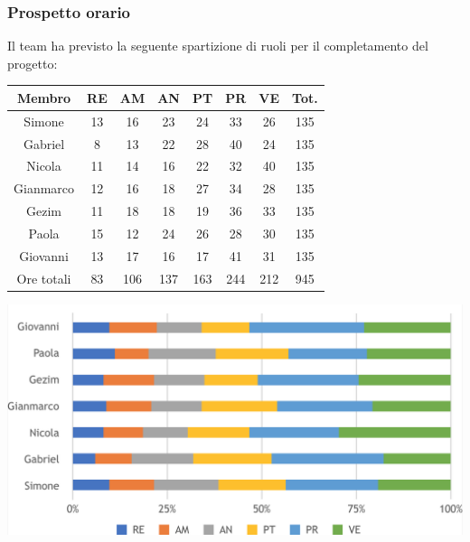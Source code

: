 \subsubsection{Prospetto orario}
Il team ha previsto la seguente spartizione di ruoli per il completamento del progetto:
\\
\begin{center}
\begin{tabular}{ |c|c|c|c|c|c|c|c|  }
 \hline
 Membro 		& RE 		& AM 		& AN 	& PT 	& PR 	& VE 	& Tot.\\
 \hline\hline
 Simone			& 13 		& 16			& 23 		& 24 		& 33 		& 26 		& 135\\
 Gabriel		& 8 			& 13 		& 22 		& 28		& 40 		& 24 		& 135\\
 Nicola			& 11 		& 14 		& 16 		& 22 		& 32 		& 40 		& 135\\
 Gianmarco		& 12 		& 16 		& 18 		& 27	 	& 34 		& 28 		& 135\\
 Gezim			& 11 		& 18 		& 18 		& 19 		& 36 		& 33	 	& 135\\
 Paola			& 15 		& 12 		& 24 		& 26 		& 28 		& 30 		& 135\\
 Giovanni		& 13 		& 17	 		& 16 		& 17 		& 41	 	& 31  		& 135\\
 \hline\hline
 Ore totali		& 83 	& 106		& 137 	& 163 	& 244 	& 212 	& 945\\
  \hline
\end{tabular}
\end{center}
\includegraphics[width=\textwidth]{res/img/hip2}
\\
